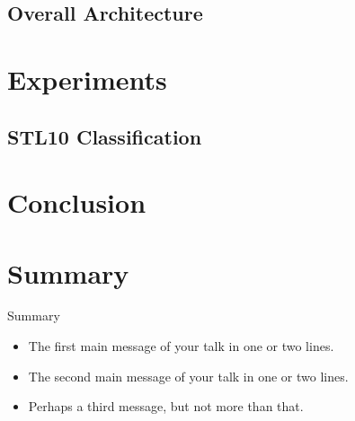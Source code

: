 \documentclass{beamer}
\begin{document}
\subsection{Overall Architecture}

\section{Experiments}

\subsection{STL10 Classification}

\begin{frame}
\end{frame}

\section{Conclusion}

\section*{Summary}

\begin{frame}{Summary}
    \begin{itemize}
    \item The \alert{first main message} of your talk in one or two lines.
    \item The \alert{second main message} of your talk in one or two lines.
    \item Perhaps a \alert{third message}, but not more than that.
    \end{itemize}
\end{frame}
\end{document}
